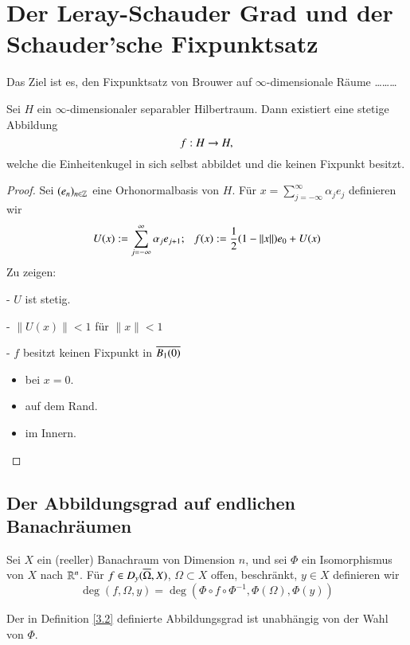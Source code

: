 \section{Der Leray-Schauder Grad und der Schauder'sche Fixpunktsatz}

Das Ziel ist es, den Fixpunktsatz von Brouwer auf $\infty$-dimensionale Räume ………

\begin{theorem}[Kakutani]\label{3.1}
    Sei $H$ ein $\infty$-dimensionaler separabler Hilbertraum. Dann existiert eine stetige Abbildung
    \[
        f:H\rightarrow H,
    \]
    welche die Einheitenkugel in sich selbst abbildet und die keinen Fixpunkt besitzt.
\end{theorem}

\begin{proof}
    Sei $(e_n)_{n\in \mathbb{Z}}$ eine Orhonormalbasis von $H$. Für $x=\sum_{j=-\infty}^\infty\alpha_je_j$
    definieren wir
    \[
        U(x):=\sum_{j=-\infty}^\infty \alpha _je_{j+1};\hspace{.25cm} f(x):=\frac12 (1-\|x\|)e_0+U(x)
    \]
    Zu zeigen:
    \begin{description}
    \item{-}
    $U$ ist stetig.
    \item{-}
    $\|U(x)\|<1$ für $\|x\|<1$
    \item{-}
    $f$ besitzt keinen Fixpunkt in $\overline{B_1(0)}$
    \begin{itemize}
        \item bei $x=0$.
        \item auf dem Rand.
        \item im Innern.
    \end{itemize}
    \end{description}
    \[  \]
\end{proof}

\subsection{Der Abbildungsgrad auf endlichen Banachräumen}

\begin{defi}\label{3.2}
    Sei $X$ ein (reeller) Banachraum von Dimension $n$, und sei $\Phi$ ein Isomorphismus von $X$ nach 
    $\mathbb{R}^n$. Für $f\in D_y(\overline \Omega,X)$, $\Omega \subset X$ offen, beschränkt, $y\in X$ definieren wir
    \[
        \deg(f,\Omega,y)=\deg(\Phi\circ f \circ \Phi^{-1},\Phi(\Omega),\Phi(y))
    \]
\end{defi}

\begin{prop}\label{3.3}
    Der in Definition \ref{3.2} definierte Abbildungsgrad ist unabhängig von der Wahl von $\Phi$.
\end{prop}

